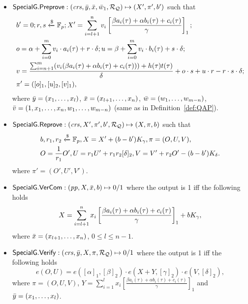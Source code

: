 \begin{definition}
\begin{itemize}
\item ${\mathsf{SpecialG}}.{\mathsf{Preprove}}: (\mathit{crs}, \bar{y}, \bar{x}, \bar{w}_1, \mathcal{R}_{\mathcal{Q}}) \mapsto (X', \pi', b')$ such that \\
\begin{align*}
&b' = 0; r, s\xleftarrow{\$} \mathbb{F}_p; X' = \sum_{i=l+1}^{n} v_i\left[ \frac{\beta a_i(\tau)+ \alpha b_i(\tau)+ c_i(\tau)}{\gamma} \right]_1;  \\
&o = \alpha + \sum_{i=0}^{m} v_i \cdot a_i(\tau) + r \cdot \delta; u = \beta + \sum_{i=0}^{m} v_i \cdot b_i(\tau) + s \cdot \delta; \\ 
&v = \frac{\sum_{i=n+1}^{m} (v_i (\beta a_i(\tau)+ \alpha b_i(\tau)+ c_i(\tau))) + h(\tau)t(\tau)}{\delta}   + o\cdot s + u \cdot r - r \cdot s \cdot \delta; \\
& \pi' = ([o]_1, [u]_2, [v]_1), 
\end{align*}
where $\bar{y} = (x_1, \ldots, x_l)$, $\bar{x} = (x_{l+1}, \ldots, x_n)$, $\bar{w} = (w_1, \ldots, w_{m-n})$, \\
$\bar{v} = (1, x_1, \ldots, x_n, w_1, \ldots, w_{m-n})$ (same as in Definition~\ref{def:QAP}).


\item ${\mathsf{SpecialG}}.{\mathsf{Reprove}}: (\mathit{crs}, X', \pi', b', \mathcal{R}_{\mathcal{Q}}) \mapsto (X, \pi, b)$  such that
\begin{align*}
&b , r_1, r_2  \xleftarrow{\$} \mathbb{F}_p, X = X' + (b- b') K_{\gamma}, \pi = (O, U, V), \\
&O = \frac{1}{r_1} O', U = r_1 U' + r_1r_2[\delta]_2, V = V' + r_2O'  - (b - b') K_{\delta} .
\end{align*}
\noindent where $\pi' = (O', U', V')$.
 
\item ${\mathsf{SpecialG}}.{\mathsf{VerCom}}: (\mathit{pp}, X, \bar{x}, b) \mapsto 0/1$ where the output is 1 iff the following holds
$$X = \sum_{i=l+1}^{n} x_i\left[ \frac{\beta a_i(\tau)+ \alpha b_i(\tau)+ c_i(\tau)}{\gamma} \right]_1  + b K_{\gamma},$$
where $\bar{x} = (x_{l+1}, \ldots, x_n)$, $ 0 \leq l \leq n-1$. 

\item ${\mathsf{SpecialG}}.{\mathsf{Verify}}: (\mathit{crs}, \bar{y}, X, \pi, \mathcal{R}_{\mathcal{Q}}) \mapsto 0/1$ where the output is 1 iff the following holds 
$$e(O,U) = e([\alpha]_1, [\beta]_2) \cdot e(X + Y, [\gamma]_2) \cdot e(V, [\delta]_2),$$
where $\pi = (O, U, V)$, $Y = \sum_{i=1}^{l} x_i\left[ \frac{\beta a_i(\tau)+ \alpha b_i(\tau)+ c_i(\tau)}{\gamma} \right]_1$ 
and $\bar{y} = (x_1, \ldots, x_l)$.


\end{itemize}
\end{definition}
